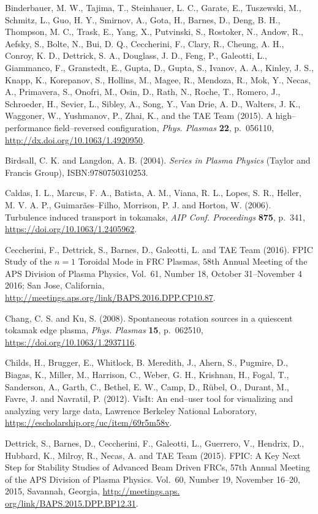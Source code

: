 \documentclass[a4paper,openany,12pt]{book}
\begin{document}
\begin{thebibliography}{100}
\bibitem{}
Binderbauer, M. W., Tajima, T., Steinhauer, L. C., Garate, E., Tuszewski, M., Schmitz, L., Guo, H. Y., Smirnov, A., Gota, H., Barnes, D., Deng, B. H., Thompson, M. C., Trask, E., Yang, X., Putvinski, S., Rostoker, N., Andow, R., Aefsky, S., Bolte, N., Bui, D. Q., Ceccherini, F., Clary, R., Cheung, A. H., Conroy, K. D., Dettrick, S. A., Douglass, J. D., Feng, P., Galeotti, L., Giammanco, F., Granstedt, E., Gupta, D., Gupta, S., Ivanov, A. A., Kinley, J. S., Knapp, K., Korepanov, S., Hollins, M., Magee, R., Mendoza, R., Mok, Y., Necas, A., Primavera, S., Onofri, M., Osin, D., Rath, N., Roche, T., Romero, J., Schroeder, H., Sevier, L., Sibley, A., Song, Y., Van Drie, A. D., Walters, J. K., Waggoner, W., Yushmanov, P., Zhai, K., and the TAE Team (2015). A high--performance field--reversed configuration, \emph{Phys. Plasmas} \textbf{22}, p.~056110,  \url{http://dx.doi.org/10.1063/1.4920950}.

\bibitem{}
Birdsall, C. K. and Langdon, A. B. (2004). \emph{Series in Plasma Physics} (Taylor and Francis Group), ISBN:9780750310253.

\bibitem{}
Caldas, I. L., Marcus, F. A., Batista, A. M., Viana, R. L., Lopes, S. R., Heller, M. V. A. P., 
Guimar\~aes--Filho, Morrison, P. J. and Horton, W. (2006). Turbulence induced transport in tokamaks, \emph{AIP Conf. Proceedings} \textbf{875}, p.~341, \url{https://doi.org/10.1063/1.2405962}.

\bibitem{}
Ceccherini, F., Dettrick, S., Barnes, D., Galeotti, L. and TAE Team (2016). FPIC Study of the $n=1$ Toroidal Mode in FRC Plasmas, 58th Annual Meeting of the APS Division of Plasma Physics, Vol.~61, Number 18, October 31--November 4 2016; San Jose, California, \url{http://meetings.aps.org/link/BAPS.2016.DPP.CP10.87}.

\bibitem{}
Chang, C. S. and Ku, S. (2008). Spontaneous rotation sources in a quiescent tokamak edge plasma, \emph{Phys. Plasmas} \textbf{15}, p.~062510, \url{https://doi.org/10.1063/1.2937116}.

\bibitem{}
Childs, H., Brugger, E., Whitlock, B. Meredith, J., Ahern, S., Pugmire, D., Biagas, K., Miller, M., Harrison, C., Weber, G. H., Krishnan, H., Fogal, T., Sanderson, A., Garth, C., Bethel, E. W., Camp, D., R\"ubel, O., Durant, M., Favre, J. and Navratil, P. (2012). VisIt: An end--user tool for visualizing and analyzing very large data, Lawrence Berkeley National Laboratory, \url{https://escholarship.org/uc/item/69r5m58v}.

\bibitem{}
Dettrick, S., Barnes, D., Ceccherini, F., Galeotti, L., Guerrero, V., Hendrix, D., Hubbard, K., Milroy, R., Necas, A. and TAE Team (2015). FPIC: A Key Next Step for Stability Studies of Advanced Beam Driven FRCs, 57th Annual Meeting of the APS Division of Plasma Physics. Vol.~60, Number 19, November 16--20, 2015, Savannah, Georgia, 
\url{http://meetings.aps. org/link/BAPS.2015.DPP.BP12.31}.


\end{thebibliography}
\end{document}
